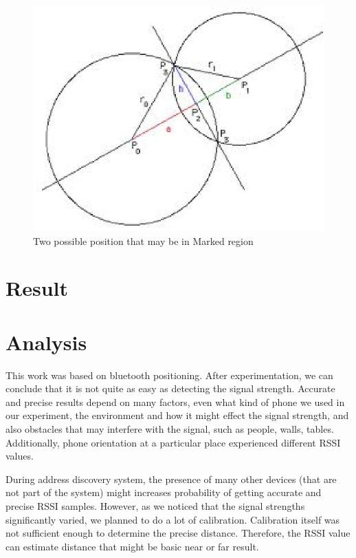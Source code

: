 \documentclass[conference,a4paper]{../../sty/IEEEtran}
\begin{document}
\begin{figure}[h!]
\centering
\includegraphics[scale=0.7]{intr.eps}
\caption{Two possible position that may be in Marked region}
\label{fig2}
\end{figure}

\section{Result}

\section{Analysis}

This work was based on bluetooth positioning. After experimentation, we can conclude that it is not quite as easy as detecting the signal strength. Accurate and precise results depend on many factors, even what kind of phone we used in our experiment, the environment and how it might effect the signal strength, and also obstacles that may interfere with the signal, such as people, walls, tables. Additionally, phone orientation at a particular place experienced different RSSI values.

During address discovery system, the presence of many other devices (that are not part of the system) might 
increases probability of getting accurate and precise RSSI samples. However, as we noticed that the signal strengths significantly varied, we planned to do a lot of calibration. Calibration itself was not sufficient enough to determine the precise distance. Therefore, the RSSI value can estimate distance that might be basic near or far result. 
\end{document}
